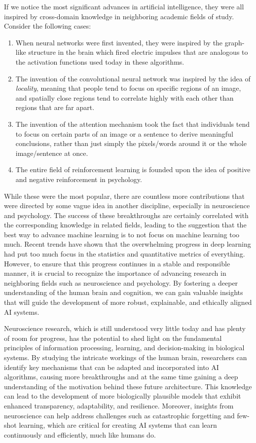 \documentclass[10pt]{article}
\begin{document}
    If we notice the most significant advances in artificial intelligence, they were all inspired by cross-domain knowledge in neighboring academic fields of study. Consider the following cases: 
    \begin{enumerate}
      \item When neural networks were first invented, they were inspired by the graph-like structure in the brain which fired electric impulses that are analogous to the activation functions used today in these algorithms. 
      \item The invention of the convolutional neural network was inspired by the idea of \textit{locality}, meaning that people tend to focus on specific regions of an image, and spatially close regions tend to correlate highly with each other than regions that are far apart. 
      \item The invention of the attention mechanism took the fact that individuals tend to focus on certain parts of an image or a sentence to derive meaningful conclusions, rather than just simply the pixels/words around it or the whole image/sentence at once. 
      \item The entire field of reinforcement learning is founded upon the idea of positive and negative reinforcement in psychology. 
    \end{enumerate}
    While these were the most popular, there are countless more contributions that were directed by some vague idea in another discipline, especially in neuroscience and psychology. The success of these breakthroughs are certainly correlated with the corresponding knowledge in related fields, leading to the suggestion that the best way to advance machine learning is to not focus on machine learning too much. Recent trends have shown that the overwhelming progress in deep learning had put too much focus in the statistics and quantitative metrics of everything. However, to ensure that this progress continues in a stable and responsible manner, it is crucial to recognize the importance of advancing research in neighboring fields such as neuroscience and psychology. By fostering a deeper understanding of the human brain and cognition, we can gain valuable insights that will guide the development of more robust, explainable, and ethically aligned AI systems. 

    Neuroscience research, which is still understood very little today and has plenty of room for progress, has the potential to shed light on the fundamental principles of information processing, learning, and decision-making in biological systems. By studying the intricate workings of the human brain, researchers can identify key mechanisms that can be adapted and incorporated into AI algorithms, causing more breakthroughs and at the same time gaining a deep understanding of the motivation behind these future architecture. This knowledge can lead to the development of more biologically plausible models that exhibit enhanced transparency, adaptability, and resilience. Moreover, insights from neuroscience can help address challenges such as catastrophic forgetting and few-shot learning, which are critical for creating AI systems that can learn continuously and efficiently, much like humans do.
\end{document}
